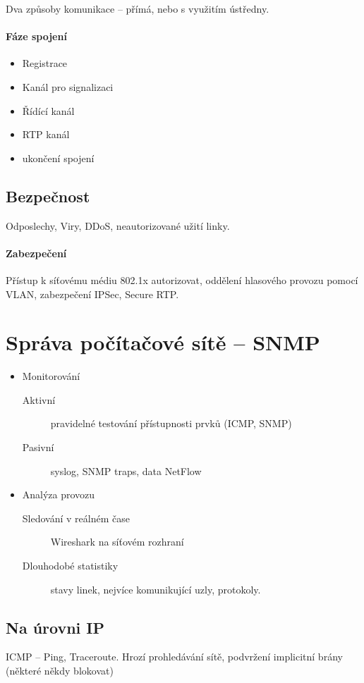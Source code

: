 \documentclass[a4paper, 11pt]{report}
\begin{document}
Dva způsoby komunikace -- přímá, nebo s využitím ústředny.

\paragraph{Fáze spojení}
\begin{itemize}
	\item Registrace
	\item Kanál pro signalizaci
	\item Řídící kanál
	\item RTP kanál
	\item ukončení spojení
\end{itemize}

\subsection{Bezpečnost}

Odposlechy, Viry, DDoS, neautorizované užití linky.

\paragraph{Zabezpečení}
Přístup k síťovému médiu 802.1x autorizovat, oddělení hlasového provozu pomocí VLAN, zabezpečení IPSec, Secure RTP.

\section{Správa počítačové sítě -- SNMP}

\begin{itemize}
	\item Monitorování \hfill
	\begin{description}
		\item[Aktivní] pravidelné testování přístupnosti prvků (ICMP, SNMP)
		\item[Pasivní] syslog, SNMP traps, data NetFlow
	\end{description}
	\item Analýza provozu \hfill
	\begin{description}
		\item[Sledování v reálném čase] Wireshark na síťovém rozhraní
		\item[Dlouhodobé statistiky] stavy linek, nejvíce komunikující uzly, protokoly.
	\end{description}
\end{itemize}

\subsection{Na úrovni IP}
ICMP -- Ping, Traceroute. Hrozí prohledávání sítě, podvržení implicitní brány (některé někdy blokovat)
\end{document}

